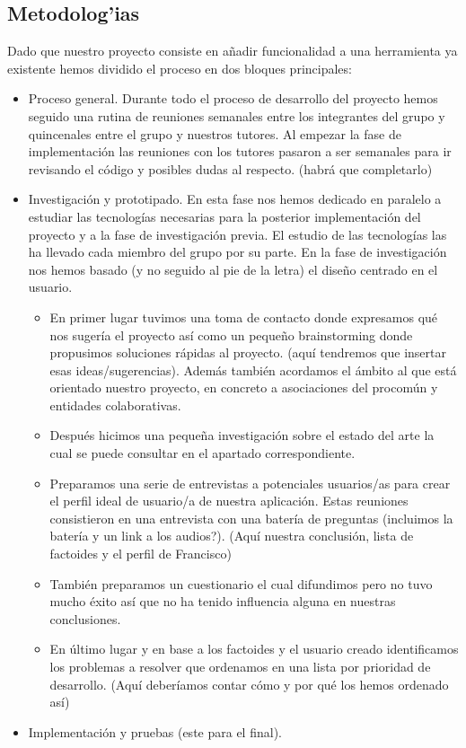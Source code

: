 \documentclass{article}
\begin{document}
	\subsection{Metodolog'ias}
	Dado que nuestro proyecto consiste en añadir funcionalidad a una herramienta ya existente hemos dividido el proceso en dos bloques principales:
		\begin{itemize}
			\item Proceso general. Durante todo el proceso de desarrollo del proyecto hemos seguido una rutina de reuniones semanales entre los integrantes del grupo y quincenales entre el grupo y nuestros tutores. Al empezar la fase de implementación las reuniones con los tutores pasaron a ser semanales para ir revisando el código y posibles dudas al respecto. (habrá que completarlo)
			\item Investigación y prototipado. En esta fase nos hemos dedicado en paralelo a estudiar las tecnologías necesarias para la posterior implementación del proyecto y a la fase de investigación previa. El estudio de las tecnologías las ha llevado cada miembro del grupo por su parte.
			En la fase de investigación nos hemos basado (y no seguido al pie de la letra) el diseño centrado en el usuario.
			\begin{itemize}
				\item En primer lugar tuvimos una toma de contacto donde expresamos qué nos sugería el proyecto así como un pequeño brainstorming donde propusimos soluciones rápidas al proyecto. (aquí tendremos que insertar esas ideas/sugerencias). Además también acordamos el ámbito al que está orientado nuestro proyecto, en concreto a asociaciones del procomún y entidades colaborativas.
				\item Después hicimos una pequeña investigación sobre el estado del arte la cual se puede consultar en el apartado correspondiente.
				\item Preparamos una serie de entrevistas a potenciales usuarios/as para crear el perfil ideal de usuario/a de nuestra aplicación. Estas reuniones consistieron en una entrevista con una batería de preguntas (incluimos la batería y un link a los audios?).
				(Aquí nuestra conclusión, lista de factoides y el perfil de Francisco)
				\item También preparamos un cuestionario el cual difundimos pero no tuvo mucho éxito así que no ha tenido influencia alguna en nuestras conclusiones.
				\item En último lugar y en base a los factoides y el usuario creado identificamos los problemas a resolver que ordenamos en una lista por prioridad de desarrollo. (Aquí deberíamos contar cómo y por qué los hemos ordenado así)
			\end{itemize}
		\item Implementación y pruebas (este para el final). 
		\end{itemize}
\end{document}
